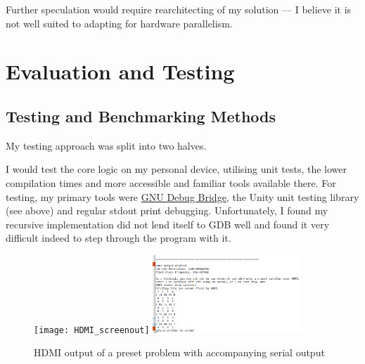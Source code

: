 \documentclass[11pt]{article}
\begin{document}
Further speculation would require rearchitecting of my solution --- I believe it is not well suited to adapting for hardware parallelism.

\section{Evaluation and Testing}

\subsection{Testing and Benchmarking Methods}\label{sec:testing_benchmarking}


My testing approach was split into two halves.

I would test the core logic on my personal device, utilising unit tests, the lower compilation times and more accessible and familiar tools available there.
For testing, my primary tools were \href{https://www.gnu.org/software/gdb/}{GNU Debug Bridge}, the Unity unit testing library (see above) and regular stdout print debugging.
Unfortunately, I found my recursive implementation did not lend itself to GDB well and found it very difficult indeed to step through the program with it.

\begin{figure}[h]
  \centering
  \texttt{[image: HDMI\_screenout]}
  \includegraphics[width=0.5\textwidth]{HDMI_serialout}
  \caption{HDMI output of a preset problem with accompanying serial output}
  \label{fig:hdmi_debug}
\end{figure}
\end{document}
